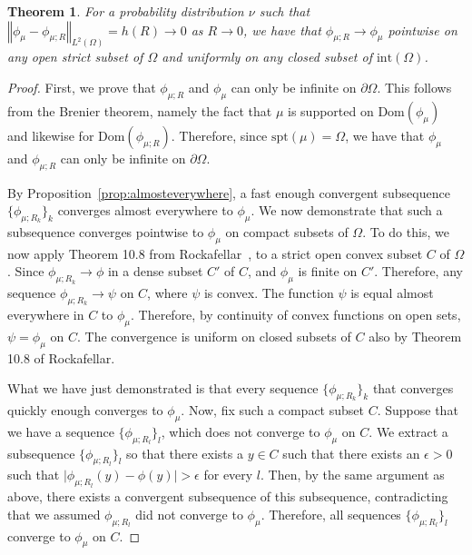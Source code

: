 \documentclass{amsart}
\newtheorem{theorem}{Theorem}
\theoremstyle{lemma}
\theoremstyle{remark}
\begin{document}
\begin{theorem}\label{thm:uniform}
For a probability distribution $\nu$ such that $\left\Vert \phi_{\mu}- \phi_{\mu;R} \right\Vert_{L^2(\Omega)} = h(R) \rightarrow 0$ as $R \rightarrow 0$, we have that $\phi_{\mu;R} \rightarrow \phi_{\mu}$ pointwise on any open strict subset of $\Omega$ and uniformly on any closed subset of $\text{int}(\Omega)$.
\end{theorem}
\begin{proof}
First, we prove that $\phi_{\mu;R}$ and $\phi_{\mu}$ can only be infinite on $\partial \Omega$. This follows from the Brenier theorem, namely the fact that $\mu$ is supported on $\text{Dom}(\phi_{\mu})$ and likewise for $\text{Dom}(\phi_{\mu;R})$. Therefore, since $\text{spt}(\mu) = \Omega$, we have that $\phi_{\mu}$ and $\phi_{\mu;R}$ can only be infinite on $\partial \Omega$.

By Proposition~\ref{prop:almosteverywhere}, a fast enough convergent subsequence $\{ \phi_{\mu;R_{k}} \}_{k}$ converges almost everywhere to $\phi_{\mu}$. We now demonstrate that such a subsequence converges pointwise to $\phi_{\mu}$ on compact subsets of $\Omega$. To do this, we now apply Theorem 10.8 from Rockafellar~\cite{rockafellar}, to a strict open convex subset $C$ of $\Omega$. Since $\phi_{\mu;R_{k}} \rightarrow \phi$ in a dense subset $C'$ of $C$, and $\phi_{\mu}$ is finite on $C'$. Therefore, any sequence $\phi_{\mu;R_{k}} \rightarrow \psi$ on $C$, where $\psi$ is convex. The function $\psi$ is equal almost everywhere in $C$ to $\phi_{\mu}$. Therefore, by continuity of convex functions on open sets, $\psi = \phi_{\mu}$ on $C$. The convergence is uniform on closed subsets of $C$ also by Theorem 10.8 of Rockafellar.

What we have just demonstrated is that every sequence $\{ \phi_{\mu;R_{k}} \}_{k}$ that converges quickly enough converges to $\phi_{\mu}$. Now, fix such a compact subset $C$. Suppose that we have a sequence $\{ \phi_{\mu;R_{l}} \}_{l}$, which does not converge to $\phi_{\mu}$ on $C$. We extract a subsequence $\{ \phi_{\mu;R_{l}} \}_{l}$ so that there exists a $y \in C$ such that there exists an $\epsilon>0$ such that $ \vert \phi_{\mu;R_{l}}(y) - \phi(y) \vert > \epsilon$ for every $l$. Then, by the same argument as above, there exists a convergent subsequence of this subsequence, contradicting that we assumed $\phi_{\mu;R_{l}}$ did not converge to $\phi_{\mu}$. Therefore, all sequences $\{ \phi_{\mu;R_{l}} \}_{l}$ converge to $\phi_{\mu}$ on $C$.
\end{proof}
\end{document}
